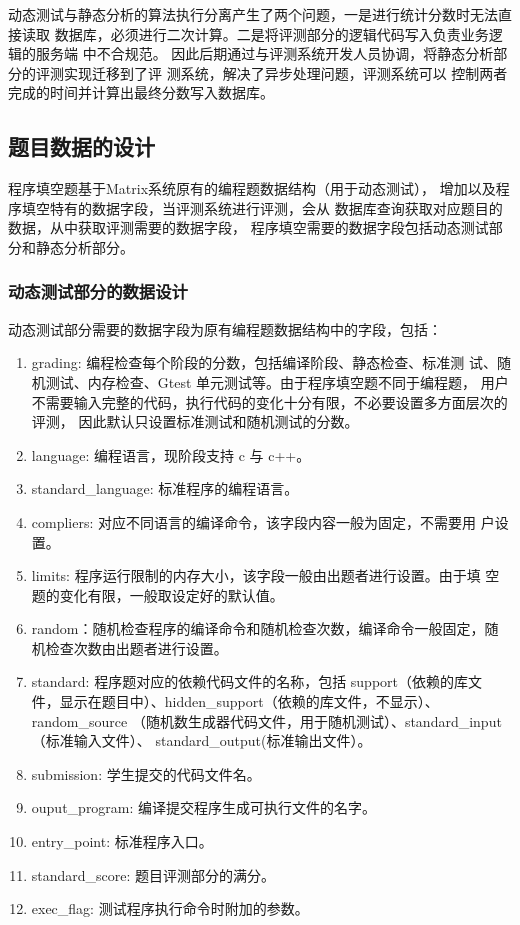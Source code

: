 动态测试与静态分析的算法执行分离产生了两个问题，一是进行统计分数时无法直接读取
数据库，必须进行二次计算。二是将评测部分的逻辑代码写入负责业务逻辑的服务端
中不合规范。
因此后期通过与评测系统开发人员协调，将静态分析部分的评测实现迁移到了评
测系统，解决了异步处理问题，评测系统可以
控制两者完成的时间并计算出最终分数写入数据库。

\subsection{题目数据的设计}
程序填空题基于Matrix系统原有的编程题数据结构（用于动态测试），
增加以及程序填空特有的数据字段，当评测系统进行评测，会从
数据库查询获取对应题目的数据，从中获取评测需要的数据字段，
程序填空需要的数据字段包括动态测试部分和静态分析部分。

\subsubsection{动态测试部分的数据设计}
动态测试部分需要的数据字段为原有编程题数据结构中的字段，包括：
\begin{enumerate}
  \item grading: 编程检查每个阶段的分数，包括编译阶段、静态检查、标准测
试、随机测试、内存检查、Gtest 单元测试等。由于程序填空题不同于编程题，
用户不需要输入完整的代码，执行代码的变化十分有限，不必要设置多方面层次的评测，
因此默认只设置标准测试和随机测试的分数。
  \item language: 编程语言，现阶段支持 c 与 c++。
  \item standard\_language: 标准程序的编程语言。
  \item compliers: 对应不同语言的编译命令，该字段内容一般为固定，不需要用
户设置。
  \item limits: 程序运行限制的内存大小，该字段一般由出题者进行设置。由于填
空题的变化有限，一般取设定好的默认值。
  \item random：随机检查程序的编译命令和随机检查次数，编译命令一般固定，随
机检查次数由出题者进行设置。
  \item standard: 程序题对应的依赖代码文件的名称，包括 support（依赖的库文
件，显示在题目中）、hidden\_support（依赖的库文件，不显示）、random\_source
（随机数生成器代码文件，用于随机测试）、standard\_input（标准输入文件）、
standard\_output(标准输出文件）。
  \item submission: 学生提交的代码文件名。
  \item ouput\_program: 编译提交程序生成可执行文件的名字。
  \item entry\_point: 标准程序入口。
  \item standard\_score: 题目评测部分的满分。
  \item exec\_flag: 测试程序执行命令时附加的参数。
\end{enumerate}

